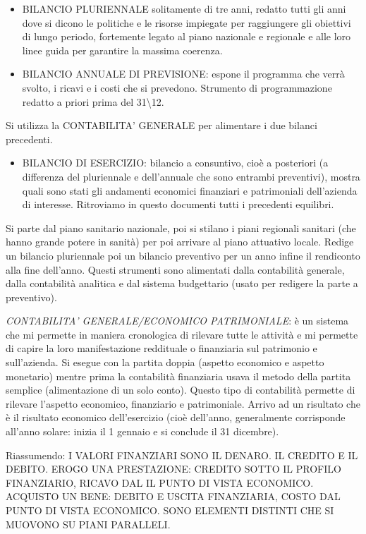 \begin{itemize}
\item
  BILANCIO PLURIENNALE solitamente di tre anni, redatto tutti gli anni
  dove si dicono le politiche e le risorse impiegate per raggiungere gli
  obiettivi di lungo periodo, fortemente legato al piano nazionale e
  regionale e alle loro linee guida per garantire la massima coerenza.
\item
  BILANCIO ANNUALE DI PREVISIONE: espone il programma che verrà svolto,
  i ricavi e i costi che si prevedono. Strumento di programmazione
  redatto a priori prima del 31\textbackslash{}12.
\end{itemize}

Si utilizza la CONTABILITA' GENERALE per alimentare i due bilanci
precedenti.

\begin{itemize}
\item
  BILANCIO DI ESERCIZIO: bilancio a consuntivo, cioè a posteriori (a
  differenza del pluriennale e dell'annuale che sono entrambi
  preventivi), mostra quali sono stati gli andamenti economici
  finanziari e patrimoniali dell'azienda di interesse. Ritroviamo in
  questo documenti tutti i precedenti equilibri.
\end{itemize}

Si parte dal piano sanitario nazionale, poi si stilano i piani regionali
sanitari (che hanno grande potere in sanità) per poi arrivare al piano
attuativo locale. Redige un bilancio pluriennale poi un bilancio
preventivo per un anno infine il rendiconto alla fine dell'anno. Questi
strumenti sono alimentati dalla contabilità generale, dalla contabilità
analitica e dal sistema budgettario (usato per redigere la parte a
preventivo).

\emph{\emph{CONTABILITA' GENERALE/ECONOMICO PATRIMONIALE}}: è un sistema
che mi permette in maniera cronologica di rilevare tutte le attività e
mi permette di capire la loro manifestazione reddituale o finanziaria
sul patrimonio e sull'azienda. Si esegue con la partita doppia (aspetto
economico e aspetto monetario) mentre prima la contabilità finanziaria
usava il metodo della partita semplice (alimentazione di un solo conto).
Questo tipo di contabilità permette di rilevare l'aspetto economico,
finanziario e patrimoniale. Arrivo ad un risultato che è il risultato
economico dell'esercizio (cioè dell'anno, generalmente corrisponde
all'anno solare: inizia il 1 gennaio e si conclude il 31 dicembre).

Riassumendo: I VALORI FINANZIARI SONO IL DENARO. IL CREDITO E IL DEBITO.
EROGO UNA PRESTAZIONE: CREDITO SOTTO IL PROFILO FINANZIARIO, RICAVO DAL
IL PUNTO DI VISTA ECONOMICO. ACQUISTO UN BENE: DEBITO E USCITA
FINANZIARIA, COSTO DAL PUNTO DI VISTA ECONOMICO. SONO ELEMENTI DISTINTI
CHE SI MUOVONO SU PIANI PARALLELI.

